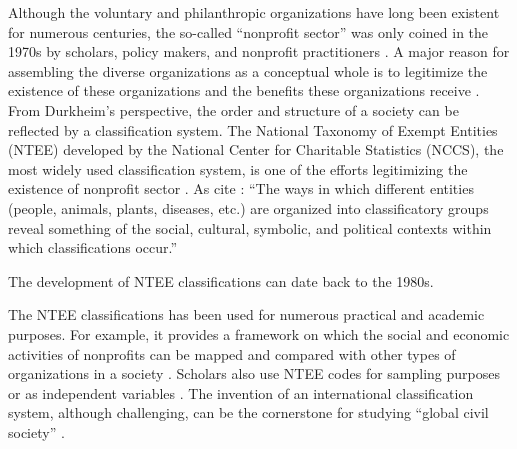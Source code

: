 \documentclass[12pt]{article}
\begin{document}
Although the voluntary and philanthropic organizations have long been existent for numerous centuries, the so-called ``nonprofit sector'' was only coined in the 1970s by scholars, policy makers, and nonprofit practitioners \parencite{HallHistoricalOverviewPhilanthropy2006}. A major reason for assembling the diverse organizations as a conceptual whole is to legitimize the existence of these organizations and the benefits these organizations receive \parencite{HallHistoricalOverviewPhilanthropy2006,BarmanClassificatoryStrugglesNonprofit2013}. From Durkheim's \citeyear{DurkheimElementaryFormsReligious2012} perspective, the order and structure of a society can be reflected by a classification system. The National Taxonomy of Exempt Entities (NTEE) developed by the National Center for Charitable Statistics (NCCS), the most widely used classification system, is one of the efforts legitimizing the existence of nonprofit sector \parencite{Hodgkinsonnewresearchplanning1991,HodgkinsonMappingnonprofitsector1990}. As \textcite[105]{BarmanClassificatoryStrugglesNonprofit2013} cite \textcite[601]{ClarkeSimpleTechnologyComplex1996}: ``The ways in which different entities (people, animals, plants, diseases, etc.) are organized into classificatory groups reveal something of the social, cultural, symbolic, and political contexts within which classifications occur.''

The development of NTEE classifications can date back to the 1980s. 
\parencites{HodgkinsonMappingnonprofitsector1990}[16]{NationalCenterforCharitableStatisticsGuideUsingNCCS2006}

The NTEE classifications has been used for numerous practical and academic purposes. For example, it provides a framework on which the social and economic activities of nonprofits can be mapped and compared with other types of organizations in a society \parencite[e.g.,][]{RoegerNonprofitSectorIts2015}. Scholars also use NTEE codes for sampling purposes \parencite[e.g.,][]{OktenDeterminantsdonationsprivate2000,CarmanEvaluationCapacityNonprofit2010} or as independent variables \parencite{SloanEffectsNonprofitAccountability2009}. The invention of an international classification system, although challenging, can be the cornerstone for studying ``global civil society'' \parencite{VakilConfrontingclassificationproblem1997,Salamonsearchnonprofitsector1992,Salamoninternationalclassificationnonprofit1996}.
\end{document}
